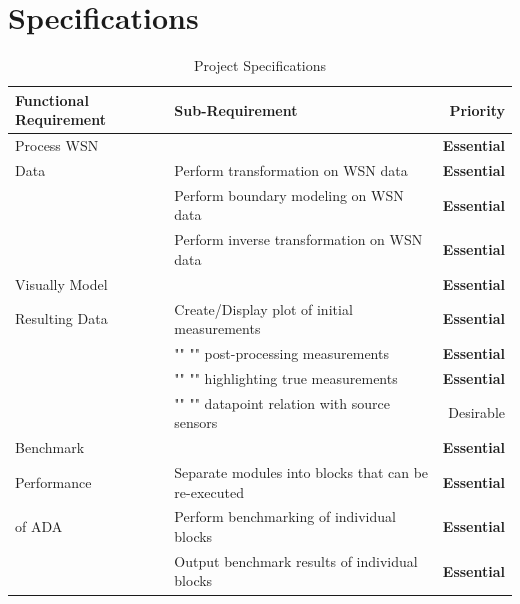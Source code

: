 \documentclass[twoside]{article}
\begin{document}
\section{Specifications}

\begin{table}[H]
\caption{Project Specifications}
\centering
\begin{tabular}{llr}
\toprule
\textbf{Functional Requirement} & \textbf{Sub-Requirement} & \textbf{Priority} \\
\midrule

Process WSN						&  											& \textbf{Essential} 	\\
Data								& Perform transformation on WSN data                          	& \textbf{Essential}	\\
                                                			& Perform boundary modeling on WSN data                      & \textbf{Essential} 	\\
                                                			& Perform inverse transformation on WSN data                 & \textbf{Essential}	\\
Visually Model			         		&                                                             				& \textbf{Essential}	\\
Resulting Data                          			& Create/Display plot of initial measurements         		& \textbf{Essential} 	\\
                                               			& "" "" post-processing measurements 				& \textbf{Essential} 	\\
                                                			& "" "" highlighting true measurements  				& \textbf{Essential} 	\\
                                                			& "" "" datapoint relation with source sensors 			& Desirable	 	\\
Benchmark						&                                                            		 		& \textbf{Essential} 	\\
Performance                            			& Separate modules into blocks that can be re-executed   & \textbf{Essential}	\\
of ADA                                      			& Perform benchmarking of individual blocks                   	& \textbf{Essential}	\\
                                                			& Output benchmark results of individual blocks               	& \textbf{Essential}	\\

\end{tabular}
\end{table}
\end{document}
